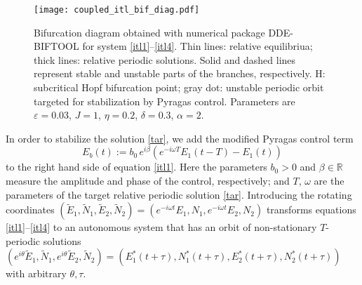 \documentclass{article}
\let\temp\phi
\let\phi\varphi
\let\varphi\temp
\let\temp\epsilon
\let\epsilon\varepsilon
\let\varepsilon\epsilon
\newcommand{\R}{\mathbb{R}}
\begin{document}
\begin{figure}[H]
	\centering
	\texttt{[image: coupled\_itl\_bif\_diag.pdf]}
	\caption{\small Bifurcation diagram obtained with numerical package DDE-BIFTOOL \cite{Engelborghs, 2001dde} for system \eqref{itl1}--\eqref{itl4}. Thin lines: relative equilibriua; thick lines: relative periodic solutions. Solid and dashed lines represent stable and unstable parts of the branches, respectively. H: subcritical Hopf bifurcation point; gray dot: unstable periodic orbit targeted for stabilization by Pyragas control. Parameters are $\epsilon=0.03$, $J=1$, $\eta=0.2$, $\delta=0.3$, $\alpha=2$.}
	\label{fig:itlbif}
\end{figure}

In order to stabilize the solution \eqref{tar}, we add the modified Pyragas control term
\begin{equation}  \label{quasipyragas}
	E_b(t) := b_0 \, e^{i\beta} \left( e^{-i \omega T} E_1(t-T) - E_1(t)\right)
\end{equation}
to the right hand side of equation \eqref{itl1}. Here the parameters $b_0>0$ and $\beta \in \R$ measure the amplitude and phase of the control, respectively; %
and $T$, $\omega$ are the parameters of the target relative periodic solution \eqref{tar}.
Introducing the rotating coordinates %
	$(\tilde{E}_1, \tilde{N}_1, \tilde{E}_2, \tilde{N}_2) = (e^{-i \omega t} E_1, N_1, e^{-i \omega t} E_2, N_2 )
$
transforms equations \eqref{itl1}--\eqref{itl4} 
to an autonomous system that 
has an orbit of non-stationary $T$-periodic solutions  $(e^{i\theta}\tilde{E}_1, \tilde{N}_1, e^{i\theta}\tilde{E}_2, \tilde{N}_2)=(E_1^*(t+\tau), N_1^*(t+\tau), E_2^*(t+\tau), N_2^*(t+\tau))$
with arbitrary $\theta,\tau$.
\end{document}
